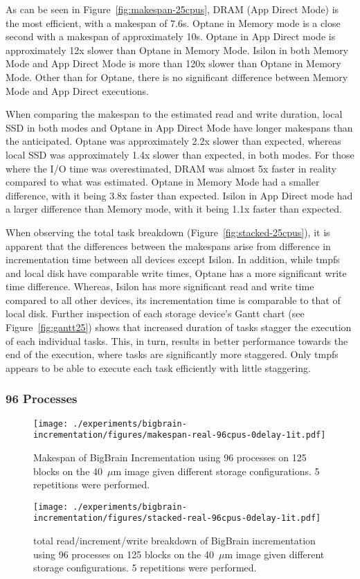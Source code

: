 \documentclass[conference]{IEEEtran}
\newcommand{\bigbrain}{BigBrain\xspace}
\begin{document}
As can be seen in Figure~\ref{fig:makespan-25cpus}, DRAM (App Direct Mode) is the 
most efficient, with a makespan of 7.6s. Optane in Memory mode is a close second
with a makespan of approximately 10s. Optane in App Direct mode is approximately 
12x slower than Optane in Memory Mode. Isilon in both Memory Mode and App Direct 
Mode is more than 120x slower than Optane in Memory Mode. Other than for Optane, 
there is no significant difference between Memory Mode and App Direct executions.

When comparing the makespan to the estimated read and write duration, local SSD
in both modes and Optane in App Direct Mode have longer makespans than the anticipated.
Optane was approximately 2.2x slower than expected, whereas local SSD was approximately
1.4x slower than expected, in both modes. For those where the I/O time was overestimated,
DRAM was almost 5x faster in reality compared to what was estimated. Optane in Memory Mode
had a smaller difference, with it being 3.8x faster than expected. Isilon in App Direct
mode had a larger difference than Memory mode, with it being 1.1x faster than expected.


When observing the total task breakdown (Figure~\ref{fig:stacked-25cpus}), it is
apparent that the differences between the makespans arise from difference in incrementation
time between all devices except Isilon. In addition, while tmpfs and local disk have comparable write times, Optane
has a more significant write time difference. Whereas, Isilon has more significant read and
write time compared to all other devices, its incrementation time is comparable to that
of local disk. Further inspection of each storage device's Gantt chart (see Figure~\ref{fig:gantt25})
shows that increased duration of tasks stagger the execution of each individual tasks. This, in turn,
results in better performance towards the end of the execution, where tasks are significantly more staggered.
Only tmpfs appears to be able to execute each task efficiently with little staggering.
\subsubsection{96 Processes}
\begin{figure}
    \texttt{[image: ./experiments/bigbrain-incrementation/figures/makespan-real-96cpus-0delay-1it.pdf]}
    \captionsetup{width=\columnwidth}
    \caption{Makespan of \bigbrain Incrementation using 96 processes on 125 blocks on the 40~$\mu$m image given different storage configurations. 5 repetitions were performed.}\label{fig:makespan-96cpus}
\end{figure}
\begin{figure}
    \texttt{[image: ./experiments/bigbrain-incrementation/figures/stacked-real-96cpus-0delay-1it.pdf]}
    \captionsetup{width=\columnwidth}
    \caption{total read/increment/write breakdown of \bigbrain incrementation using 96 processes on 125 blocks on the 40~$\mu$m image given different storage configurations. 5 repetitions were performed.}\label{fig:stacked-96cpus}
\end{figure}
\end{document}
